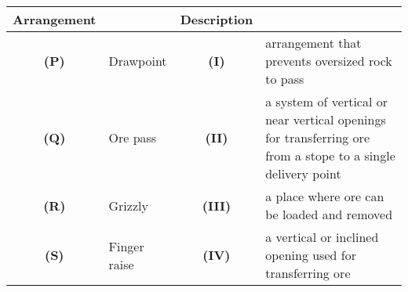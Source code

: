 \begin{tabular}{>{\bfseries}c p{4cm} >{\bfseries}c p{8cm}}
Arrangement & & Description & \\
\hline
(P) & Drawpoint   & (I) & arrangement that prevents oversized rock to pass \\
(Q) & Ore pass    & (II) & a system of vertical or near vertical openings for transferring ore from a stope to a single delivery point \\
(R) & Grizzly     & (III) & a place where ore can be loaded and removed \\
(S) & Finger raise & (IV) & a vertical or inclined opening used for transferring ore \\
\end{tabular}